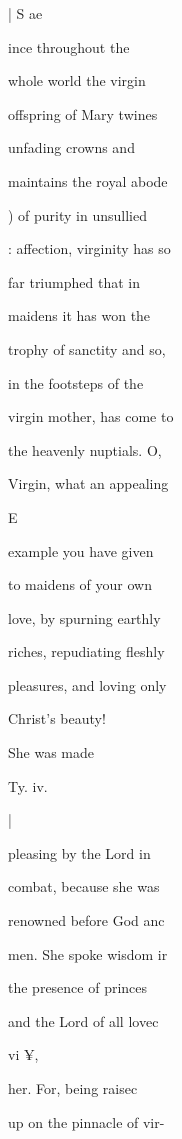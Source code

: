 \documentclass{breviary}
\begin{document}
\begin{brevbody}
\blackrule
\begin{rubricpar}
| S ae

\end{rubricpar}
ince throughout the

whole world the virgin

offspring of Mary twines

unfading crowns and

maintains the royal abode

) of purity in unsullied

: affection, virginity has so

far triumphed that in

maidens it has won the

trophy of sanctity and so,

in the footsteps of the

virgin mother, has come to

the heavenly nuptials. O,

Virgin, what an appealing

\begin{rubricpar}
E

\end{rubricpar}
example you have given

to maidens of your own

love, by spurning earthly

riches, repudiating fleshly

pleasures, and loving only

Christ’s beauty!

She was made

\begin{rubricpar}
Ty. iv.

|

\end{rubricpar}
pleasing by the Lord in

combat, because she was

renowned before God anc

men. She spoke wisdom ir

the presence of princes

and the Lord of all lovec

\begin{rubricpar}
vi ¥,

\end{rubricpar}
her. For, being raisec

up on the pinnacle of vir-


\end{brevbody}
\end{document}
